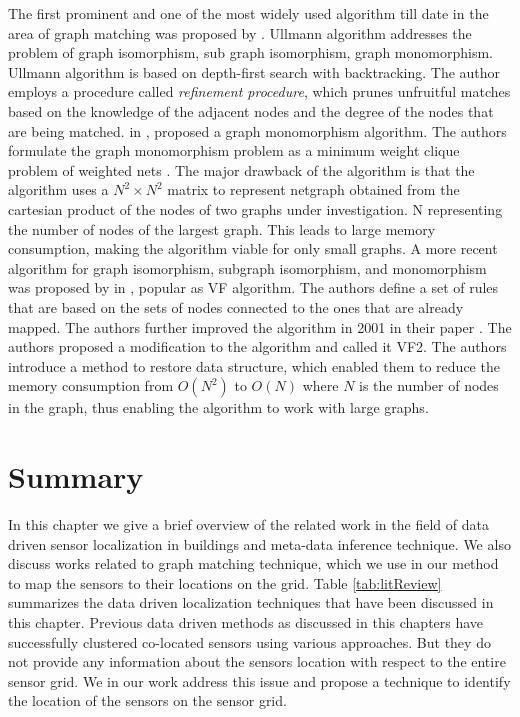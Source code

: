 The first prominent and one of the most widely used algorithm till date in the area of graph matching was proposed by \citeauthor{Ullmann:1976:ASI:321921.321925} \cite{Ullmann:1976:ASI:321921.321925}.
Ullmann algorithm addresses the problem of graph isomorphism, sub graph isomorphism, graph monomorphism. Ullmann algorithm is based on  depth-first search with backtracking.
The author employs a procedure called \textit{refinement procedure}, which prunes unfruitful matches based on the knowledge of the adjacent nodes and the degree of the nodes that are being matched.
\citeauthor{4308468} in \cite{4308468}, proposed a graph monomorphism algorithm.
The authors formulate the graph monomorphism problem as a minimum weight clique problem of weighted nets .
The major drawback of the algorithm is that the algorithm uses a $N^2 \times N^2$ matrix to represent netgraph obtained from the cartesian product of the nodes of two graphs under investigation.
N representing the number of nodes of the largest graph. This leads to large memory consumption, making the algorithm viable for only small graphs.
A more recent algorithm for graph isomorphism, subgraph isomorphism, and monomorphism was proposed by \citeauthor{906251} in \cite{906251}, popular as VF algorithm. 
The authors define a set of rules that are based on the sets of nodes connected to the ones that are already mapped.
The authors further improved the algorithm in 2001 in their paper \cite{cordella2001improved}. 
The authors proposed a modification to the algorithm and called it VF2.
The authors introduce a method to restore data structure, which enabled them to reduce the memory consumption from $O(N^2)$ to $O(N)$ where $N$ is the number of nodes in the graph, thus enabling the algorithm to work with large graphs.

\section{Summary}
In this chapter we give a brief overview of the related work in the field of data driven sensor localization in buildings and meta-data inference technique. We also discuss works related to graph matching technique, which we use in our method to map the sensors to their locations on the grid. Table \ref{tab:litReview} summarizes the data driven localization techniques that have been discussed in this chapter.
Previous data driven methods as discussed in this chapters have successfully clustered co-located sensors using various approaches. But they do not provide any information about the sensors location with respect to the entire sensor grid. We in our work address this issue and propose a technique to identify the location of the sensors on the sensor grid.

